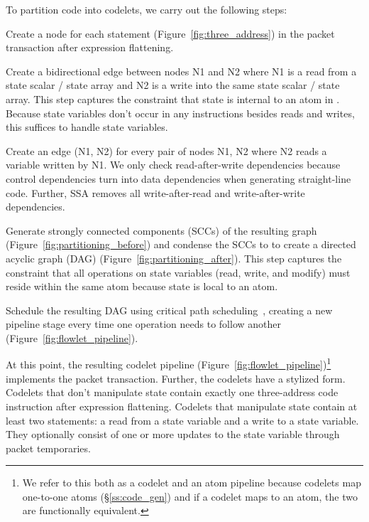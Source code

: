 To partition code into codelets, we carry out the following steps:
\begin{CompactEnumerate}
  \item Create a node for each statement (Figure~\ref{fig:three_address}) in
    the packet transaction after expression flattening.
  \item Create a bidirectional edge between nodes N1 and N2 where N1 is a read from a
    state scalar / state array and N2 is a write into the same state scalar /
    state array. This step captures the constraint that state is internal to an
    atom in \absmachine. Because state variables don't occur in any
    instructions besides reads and writes, this suffices to handle state variables.
  \item Create an edge (N1, N2) for every pair of nodes N1, N2 where N2 reads
    a variable written by N1. We only check read-after-write dependencies because
    control dependencies turn into data dependencies when generating straight-line
    code. Further, SSA removes all write-after-read and write-after-write dependencies.
  \item Generate strongly connected components (SCCs) of the resulting graph
    (Figure~\ref{fig:partitioning_before}) and condense the SCCs to to create a directed
    acyclic graph (DAG) (Figure~\ref{fig:partitioning_after}). This step captures the
    constraint that all operations on state variables (read, write, and modify)
    must reside within the same atom because state is local to an atom.
  \item Schedule the resulting DAG using critical path
    scheduling~\cite{crit_path_sched}, creating a new pipeline stage every time
    one operation needs to follow another (Figure~\ref{fig:flowlet_pipeline}).
\end{CompactEnumerate}
At this point, the resulting codelet pipeline
(Figure~\ref{fig:flowlet_pipeline})\footnote{We refer to this both as a
codelet and an atom pipeline because codelets map one-to-one atoms
(\S\ref{ss:code_gen}) and if a codelet maps to an atom, the two are
functionally equivalent.} implements the packet transaction.  Further, the codelets have a
stylized form.  Codelets that don't manipulate state contain exactly one
three-address code instruction after expression flattening. Codelets that
manipulate state contain at least two statements: a read from a state variable
and a write to a state variable.  They optionally consist of one or more
updates to the state variable through packet temporaries.

